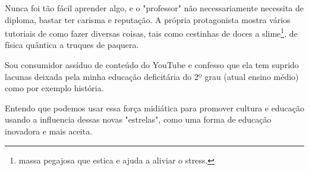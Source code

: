 Nunca foi tão fácil aprender algo, e o "professor"  não necessariamente necessita de diploma, bastar ter carisma e reputação. A própria protagonista mostra vários tutoriais de como fazer diversas coisas, tais como cestinhas de doces a slime\footnote{ massa pegajosa que estica e ajuda a aliviar o stress.}, de física quântica a truques de paquera.

Sou consumidor assíduo de conteúdo do YouTube e confesso que ela tem suprido lacunas deixada pela minha educação deficitária do 2º grau (atual ensino médio) como por exemplo história.

Entendo que podemos usar essa força midiática para promover cultura e educação usando a influencia dessas novas "estrelas", como uma forma de educação inovadora e mais aceita.